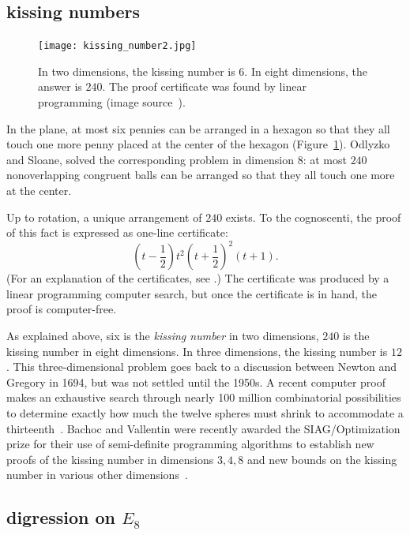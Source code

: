 \documentclass{llncs}
\begin{document}
\subsection{kissing numbers} %


\begin{figure}[h!]
  \centering
\texttt{[image: kissing\_number2.jpg]}
\caption{In two dimensions, the kissing number is $6$. In eight
  dimensions, the answer is $240$.  The proof certificate was found by
  linear programming (image source~\cite{SIAG}).}
\label{fig:kissing}
\end{figure}


In the plane, at most six pennies can be arranged in a hexagon so that
they all touch one more penny placed at the center of the hexagon
(Figure~\ref{fig:kissing}).  Odlyzko and Sloane, solved the
corresponding problem in dimension $8$: at most $240$ nonoverlapping
congruent balls can be arranged so that they all touch one more at the
center.

Up to rotation, a unique arrangement of $240$ exists.  To the
cognoscenti, the proof of this fact is expressed as one-line
certificate:
\[
(t - \frac{1}{2})t^2(t + \frac{1}{2})^2 (t + 1).
\]
(For an explanation of the certificates, see \cite{PZ}.)  The
certificate was produced by a linear programming computer search, but
once the certificate is in hand, the proof is computer-free.

As explained above, six is the {\it kissing number} in two dimensions,
$240$ is the kissing number in eight dimensions. In three dimensions,
the kissing number is $12$.  This three-dimensional problem goes back
to a discussion between Newton and Gregory in 1694, but was not
settled until the 1950s.  A recent computer proof makes an exhaustive
search through nearly 100 million combinatorial possibilities to
determine exactly how much the twelve spheres must shrink to
accommodate a thirteenth~\cite{Musin-Tarasov}.  Bachoc and Vallentin
were recently awarded the SIAG/Optimization prize for their use of
semi-definite programming algorithms to establish new proofs of the
kissing number in dimensions $3,4,8$ and new bounds on the kissing
number in various other dimensions~\cite{BV08}.



\subsection{digression on $E_8$}\label{sec:e8}
\end{document}
